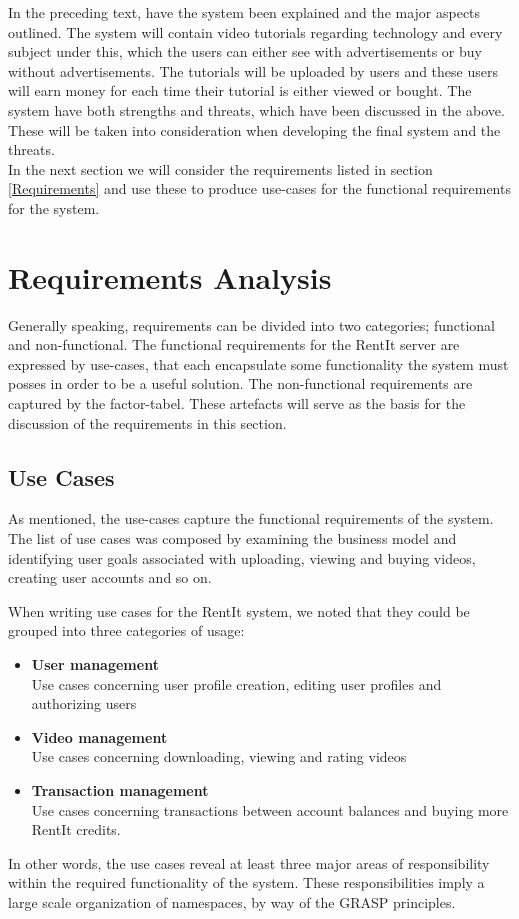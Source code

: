In the preceding text, have the system been explained and the major aspects outlined. The system will contain video tutorials regarding technology and every subject under this, which the users can either see with advertisements or buy without advertisements. The tutorials will be uploaded by users and these users will earn money for each time their tutorial is either viewed or bought.
The system have both strengths and threats, which have been discussed in the above. These will be taken into consideration when developing the final system and the threats.\\

In the next section we will consider the requirements listed in section \ref{Requirements} and use these to produce use-cases for the functional requirements for the system. 

\section{Requirements Analysis}
Generally speaking, requirements can be divided into two categories; functional and non-functional. The functional requirements for the RentIt server are expressed by use-cases, that each encapsulate some functionality the system must posses in order to be a useful solution. The non-functional requirements are captured by the factor-tabel.
  These artefacts will serve as the basis for the discussion of the requirements in this section.
\subsection{Use Cases}
As mentioned, the use-cases capture the functional requirements of the system. The list of use cases was composed by examining the business model and identifying user goals associated with uploading, viewing and buying videos, creating user accounts and so on.

When writing use cases for the RentIt system, we noted that they could be grouped into three categories of usage:
\begin{itemize}
\item \textbf{User management}\\
Use cases concerning user profile creation, editing user profiles and authorizing users
\item \textbf{Video management}\\
Use cases concerning downloading, viewing and rating videos
\item \textbf{Transaction management}\\
Use cases concerning transactions between account balances and buying more RentIt credits.
\end{itemize}
In other words, the use cases reveal at least three major areas of responsibility within the required functionality of the system. These responsibilities imply a large scale organization of namespaces, by way of the GRASP principles.

